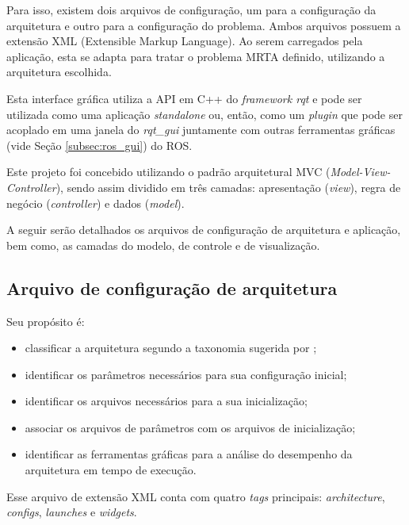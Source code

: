         Para isso, existem dois arquivos de configuração, um para a configuração da arquitetura e outro para a configuração do problema. Ambos arquivos possuem a extensão XML (Extensible Markup Language). Ao serem carregados pela aplicação, esta se adapta para tratar o problema MRTA definido, utilizando a arquitetura escolhida. 
        
        Esta interface gráfica utiliza a API em C++ do \textit{framework rqt} e pode ser utilizada como uma aplicação \textit{standalone} ou, então, como um \textit{plugin} que pode ser acoplado em uma janela do \textit{rqt\_gui} juntamente com outras ferramentas gráficas (vide Seção \ref{subsec:ros_gui}) do ROS.
        
        Este projeto foi concebido utilizando o padrão arquitetural MVC (\textit{Model-View-Controller}), sendo assim dividido em três camadas: apresentação (\textit{view}), regra de negócio (\textit{controller}) e dados (\textit{model}).
        
        A seguir serão detalhados os arquivos de configuração de arquitetura e aplicação, bem como, as camadas do modelo, de controle e de visualização.
        
        \subsection{Arquivo de configuração de arquitetura} \label{subsec:arch_config}
            Seu propósito é:
            
            \begin{itemize}
                \item classificar a arquitetura segundo a taxonomia sugerida por ;
                \item identificar os parâmetros necessários para sua configuração inicial;
                \item identificar os arquivos necessários para a sua inicialização;
                \item associar os arquivos de parâmetros com os arquivos de inicialização;
                \item identificar as ferramentas gráficas para a análise do desempenho da arquitetura em tempo de execução.
            \end{itemize}
            
            Esse arquivo de extensão XML conta com quatro \textit{tags} principais: \textit{architecture}, \textit{configs}, \textit{launches} e \textit{widgets}. 
            

